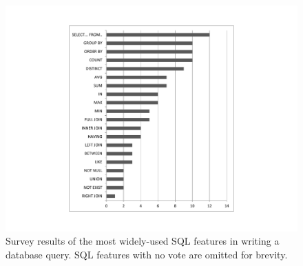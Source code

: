 
\begin{figure}[t]
  \centering
  \includegraphics[scale=0.45]{survey}
  \vspace*{-3.0ex}\caption {{\label{fig:survey}
  Survey results of the most widely-used SQL features
  in writing a database query. 
  SQL features with no vote are omitted 
  for brevity.
}}
\end{figure}

\newcommand{\q}{\langle query\rangle}
\newcommand{\db}{\langle db\rangle}
\newcommand{\pat}{\langle pat\rangle}
\newcommand{\bug}{\langle bug\rangle}
\newcommand{\dist}{\langle distance\rangle}
\newcommand{\sem}[1]{\llbracket #1\rrbracket}
\newcommand{\lit}[1]{\texttt{#1}}

\newcommand{\column}{\langle column\rangle}
\newcommand{\dbtable}{\langle table\rangle}
\newcommand{\cond}{\langle cond\rangle}
\newcommand{\op}{\langle op\rangle}
\newcommand{\e}{\langle expr\rangle}
\newcommand{\ce}{\langle cexpr\rangle}

